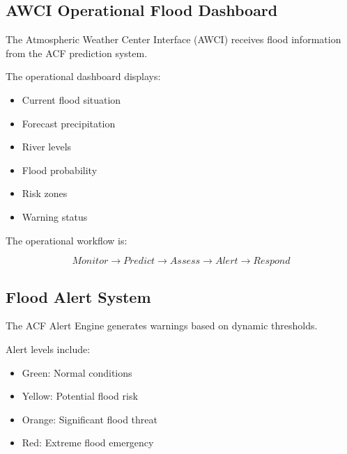 
\subsection{AWCI Operational Flood Dashboard}

The Atmospheric Weather Center Interface (AWCI) receives flood
information from the ACF prediction system.

The operational dashboard displays:

\begin{itemize}

\item Current flood situation

\item Forecast precipitation

\item River levels

\item Flood probability

\item Risk zones

\item Warning status

\end{itemize}


The operational workflow is:

\[
Monitor
\rightarrow
Predict
\rightarrow
Assess
\rightarrow
Alert
\rightarrow
Respond
\]



\subsection{Flood Alert System}

The ACF Alert Engine generates warnings based on dynamic thresholds.

Alert levels include:

\begin{itemize}

\item Green: Normal conditions

\item Yellow: Potential flood risk

\item Orange: Significant flood threat

\item Red: Extreme flood emergency

\end{itemize}


